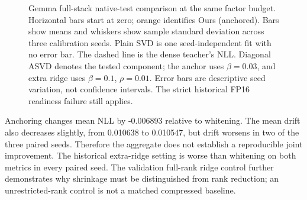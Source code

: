 \documentclass[conference]{IEEEtran}
\begin{document}
\begin{figure}[t]
\caption{Gemma full-stack native-test comparison at the same factor budget.
Horizontal bars start at zero; orange identifies Ours (anchored).
Bars show means and whiskers show sample standard deviation across three
calibration seeds. Plain SVD is one seed-independent fit with no error bar.
The dashed line is the dense teacher's NLL. Diagonal ASVD denotes the tested
component; the anchor uses $\beta=0.03$, and extra ridge uses $\beta=0.1$,
$\rho=0.01$. Error bars are descriptive seed variation, not confidence intervals.
The strict historical FP16 readiness failure still applies.}
\label{fig:gemma-summary}
\end{figure}
Anchoring changes mean NLL by -0.006893 relative to whitening. The mean drift also decreases slightly, from 0.010638 to 0.010547, but drift worsens in two of the three paired seeds. Therefore the aggregate does not establish a reproducible joint improvement. The historical extra-ridge setting is worse than whitening on both metrics in every paired seed. The validation full-rank ridge control further demonstrates why shrinkage must be distinguished from rank reduction; an unrestricted-rank control is not a matched compressed baseline.\par\smallskip
\end{document}
